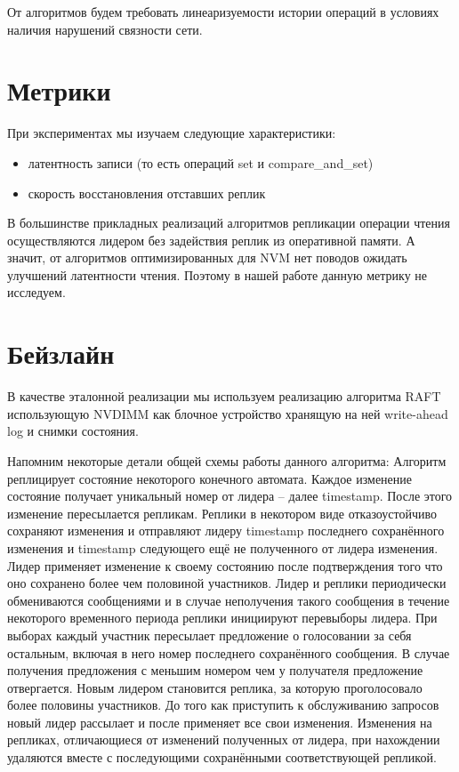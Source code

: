 \documentclass[pdftex,ptm,12pt,a4paper]{report}
\theoremstyle{definition}
\begin{document}
От алгоритмов будем требовать линеаризуемости \cite{linearizability} истории операций в условиях наличия нарушений связности сети.

\section{Метрики}
При экспериментах мы изучаем следующие характеристики:
\begin{itemize}
    \item латентность записи (то есть операций set и compare\_and\_set)
    \item скорость восстановления отставших реплик
\end{itemize}

В большинстве прикладных реализаций алгоритмов репликации операции чтения осуществляются лидером без задействия реплик из оперативной памяти.
А значит, от алгоритмов оптимизированных для NVM нет поводов ожидать улучшений латентности чтения. Поэтому в нашей работе данную метрику не исследуем.

\section{Бейзлайн}
В качестве эталонной реализации мы используем реализацию алгоритма RAFT \cite{raftpaper} использующую NVDIMM как блочное устройство
хранящую на ней write-ahead log и снимки состояния.

\label{baseline}
Напомним некоторые детали общей схемы работы данного алгоритма:
Алгоритм реплицирует состояние некоторого конечного автомата. Каждое изменение состояние получает уникальный номер от лидера -- далее timestamp.
После этого изменение пересылается репликам. Реплики в некотором виде отказоустойчиво сохраняют изменения и отправляют лидеру timestamp последнего сохранённого изменения
и timestamp следующего ещё не полученного от лидера изменения. Лидер применяет изменение к своему состоянию после подтверждения того что оно сохранено более чем половиной участников.
Лидер и реплики периодически обмениваются сообщениями и в случае неполучения такого сообщения в течение некоторого временного периода реплики инициируют перевыборы лидера.
При выборах каждый участник пересылает предложение о голосовании за себя остальным, включая в него номер последнего сохранённого сообщения. В случае получения предложения с меньшим
номером чем у получателя предложение отвергается. Новым лидером становится реплика, за которую проголосовало более половины участников. До того как приступить к обслуживанию
запросов новый лидер рассылает и после применяет все свои изменения. Изменения на репликах, отличающиеся от изменений полученных от лидера, при нахождении удаляются вместе
с последующими сохранёнными соответствующей репликой.
\end{document}
